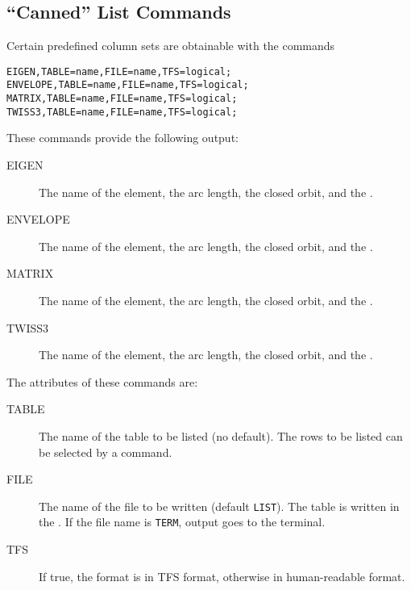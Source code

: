 \subsection{``Canned'' List Commands}
\label{sec:canned}
Certain predefined column sets are obtainable with the commands
\begin{verbatim}
EIGEN,TABLE=name,FILE=name,TFS=logical;
ENVELOPE,TABLE=name,FILE=name,TFS=logical;
MATRIX,TABLE=name,FILE=name,TFS=logical;
TWISS3,TABLE=name,FILE=name,TFS=logical;
\end{verbatim}
These commands provide the following output:
\begin{description}
\item[EIGEN]
  The name of the element, the arc length, the closed orbit,
  and the .
\item[ENVELOPE]
  The name of the element, the arc length, the closed orbit,
  and the .
\item[MATRIX]
  The name of the element, the arc length, the closed orbit,
  and the .
\item[TWISS3]
  The name of the element, the arc length, the closed orbit,
  and the .
\end{description}
The attributes of these commands are:
\begin{description}
\item[TABLE]
  The name of the table to be listed (no default). 
  The rows to be listed can be selected by a
   command.
\item[FILE]
  The name of the file to be written (default \texttt{LIST}).
  The table is written in the .
  If the file name is \texttt{TERM}, output goes to the terminal.
\item[TFS]
  If true, the format is in TFS format, otherwise in human-readable
  format. 
\end{description}

